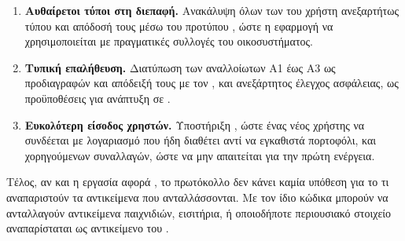 \begin{enumerate}
        συμβάντων με ερωτήματα σε ευρετηριασμένη βάση, ώστε το κόστος ανάγνωσης να
        εξαρτάται από το πλήθος των ενεργών προσφορών. Τα συμβάντα που ήδη εκπέμπει το
        συμβόλαιο επαρκούν για την κατασκευή του ευρετηρίου.
  \item \textbf{Αυθαίρετοι τύποι στη διεπαφή.} Ανακάλυψη όλων των  του χρήστη
        ανεξαρτήτως τύπου και απόδοσή τους μέσω του προτύπου , ώστε η εφαρμογή
        να χρησιμοποιείται με πραγματικές συλλογές του οικοσυστήματος.
  \item \textbf{Τυπική επαλήθευση.} Διατύπωση των αναλλοίωτων Α1 έως Α3 ως προδιαγραφών και
        απόδειξή τους με τον , και ανεξάρτητος έλεγχος ασφάλειας, ως
        προϋποθέσεις για ανάπτυξη σε .
  \item \textbf{Ευκολότερη είσοδος χρηστών.} Υποστήριξη , ώστε ένας νέος
        χρήστης να συνδέεται με λογαριασμό που ήδη διαθέτει αντί να εγκαθιστά πορτοφόλι,
        και χορηγούμενων συναλλαγών, ώστε να μην απαιτείται  για την πρώτη
        ενέργεια.
\end{enumerate}

Τέλος, αν και η εργασία αφορά , το πρωτόκολλο δεν κάνει καμία υπόθεση για το τι
αναπαριστούν τα αντικείμενα που ανταλλάσσονται. Με τον ίδιο κώδικα μπορούν να ανταλλαγούν
αντικείμενα παιχνιδιών, εισιτήρια, ή οποιοδήποτε περιουσιακό στοιχείο αναπαρίσταται ως
αντικείμενο του .
